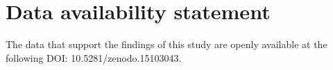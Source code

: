 \documentclass[a4paper,fleqn]{cas-dc}
\begin{document}




\printcredits

\section*{Data availability statement}
The data that support the findings of this study are openly available at the
following DOI: 10.5281/zenodo.15103043.

%





\end{document}
